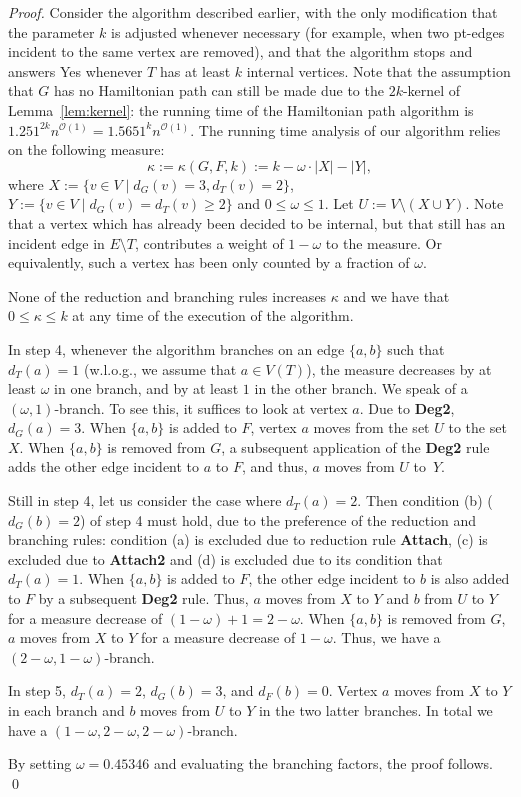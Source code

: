 \documentclass{llncs}
\newcommand{\longversion}[1]{#1}
\newcommand{\shortversion}[1]{}
\newcommand{\mc}{\mathcal}
\newcommand{\Oh}{{\mc{O}}}
\begin{document}
\begin{proof}
 Consider the algorithm described earlier, with the only modification that the parameter $k$ is adjusted whenever necessary (for example, when two pt-edges incident to the same vertex are removed), and that the algorithm stops and answers Yes whenever $T$ has at least $k$ internal vertices. Note that the assumption that $G$ has no Hamiltonian path can still be made due to the $2k$-kernel of Lemma~\ref{lem:kernel}: the running time of the Hamiltonian path algorithm is $1.251^{2k}n^{\Oh(1)}=1.5651^k n^{\Oh(1)}$.
 The running time analysis of our algorithm relies on the following measure:
 \[
  \kappa := \kappa(G,F,k) := k - \omega \cdot |X| - |Y|,
 \]
 where $X:=\{v\in V \mid d_G(v)=3, d_T(v)=2\}$, $Y:=\{v\in V \mid d_G(v)=d_T(v)\ge 2\}$ and $0 \le \omega \le 1$. Let $U:=V\setminus (X \cup Y)$.
 Note that a vertex which has already been decided to be internal, but that still has an incident edge in $E \setminus T$, contributes a weight of
$1-\omega$ to the measure.
Or equivalently, such a vertex has  been only counted by a fraction of $\omega$.
 
 None of the reduction and branching rules increases $\kappa$ and we have that $0 \le \kappa \le k$ at any time of the execution of the algorithm.
 
\longversion{
 In step 4, whenever the algorithm branches on an edge $\{a,b\}$ such that $d_T(a)=1$ (w.l.o.g., we assume  \longversion{that }$a\in V(T)$), the measure decreases by at least $\omega$ in one branch, and by at least $1$ in the other branch. We speak of a $(\omega,1)$-branch. To see this, it suffices to look at vertex $a$. Due to \textbf{Deg2}, $d_G(a)=3$. When $\{a,b\}$ is added to $F$, vertex $a$ moves from the set $U$ to the set $X$. When $\{a,b\}$ is removed from $G$, a subsequent application of the {\bf Deg2} rule adds the other edge incident to $a$ to $F$, and thus, $a$ moves from $U$ to~$Y$.
 
 Still in step 4, let us consider the case where $d_T(a)=2$. Then condition (b) ($d_G(b)=2$) of step 4 must hold, due to the preference of the reduction and branching rules: condition (a) is excluded due to reduction rule \textbf{Attach}, (c) is excluded due to \textbf{Attach2} and (d) is excluded due to its condition that $d_T(a)=1$. When $\{a,b\}$ is added to $F$, the other edge incident to $b$ is also added to $F$ by a subsequent {\bf Deg2} rule. Thus, $a$ moves from $X$ to $Y$ and $b$ from $U$ to $Y$ for a measure decrease of $(1-\omega)+1=2-\omega$. When $\{a,b\}$ is removed from $G$, $a$ moves from $X$ to $Y$ for a measure decrease of $1-\omega$. Thus, we have a $(2-\omega,1-\omega)$-branch.
 
 In step 5, $d_T(a)=2$, $d_G(b)=3$, and $d_F(b)=0$. Vertex $a$ moves from $X$ to $Y$ in each branch and $b$ moves from $U$ to $Y$ in the two latter branches. In total we have a $(1-\omega,2-\omega,2-\omega)$-branch.
}

 
 By \shortversion{a simple case analysis, }setting $\omega = 0.45346$ and evaluating the branching factors, the proof follows.
\qed
\end{proof}
\end{document}
